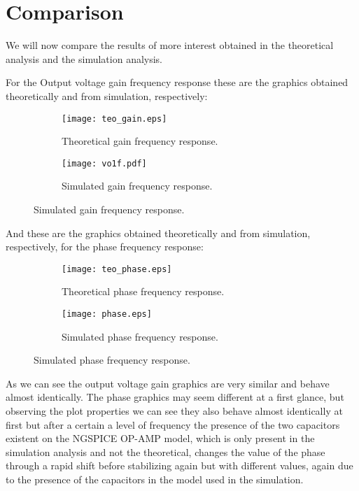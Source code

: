 \newpage
\section{Comparison}
\label{sec:comparison}
\par
We will now compare the results of more interest obtained in the theoretical analysis and the simulation analysis.\par


For the Output voltage gain frequency response these are the graphics obtained theoretically and from simulation, respectively:

\begin{figure}[!htb]
     \begin{subfigure}[b]{0.48\textwidth}
         \centering
         \texttt{[image: teo\_gain.eps]}
         \caption{Theoretical gain frequency response.}
     \end{subfigure}
     \hfill
     \begin{subfigure}[b]{0.48\textwidth}
         \centering
         \texttt{[image: vo1f.pdf]}
         \caption{Simulated gain frequency response.}
     \end{subfigure}
\end{figure}

And these are the graphics obtained theoretically and from simulation, respectively, for the phase frequency response:


\begin{figure}[H]
     \begin{subfigure}[H]{0.48\textwidth}
         \centering
         \texttt{[image: teo\_phase.eps]}
         \caption{Theoretical phase frequency response.}
     \end{subfigure}
     \hfill
     \begin{subfigure}[H]{0.48\textwidth}
         \centering
         \texttt{[image: phase.eps]}
         \caption{Simulated phase frequency response.}
     \end{subfigure}
\end{figure}

As we can see the output voltage gain graphics are very similar and behave almost identically. The phase graphics may seem different at a first glance, but observing the plot properties we can see they also behave almost identically at first but after a certain a level of frequency the presence of the two capacitors existent on the NGSPICE OP-AMP model, which is only present in the simulation analysis and not the theoretical, changes the value of the phase through a rapid shift before stabilizing again but with different values, again due to the presence of the capacitors in the model used in the simulation.

